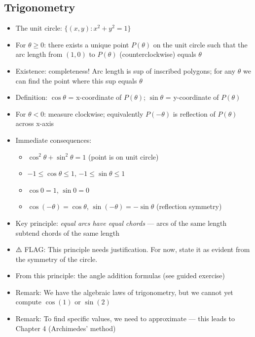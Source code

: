 \documentclass[
  10pt,
  letterpaper,
]{scrbook}
\providecommand{\tightlist}{%
  \setlength{\itemsep}{0pt}\setlength{\parskip}{0pt}}
\begin{document}
\subsection{Trigonometry}\label{trigonometry}

\begin{itemize}
\tightlist
\item
  The unit circle: \(\{(x, y) : x^2 + y^2 = 1\}\)
\item
  For \(\theta \geq 0\): there exists a unique point \(P(\theta)\) on
  the unit circle such that the arc length from \((1, 0)\) to
  \(P(\theta)\) (counterclockwise) equals \(\theta\)
\item
  Existence: completeness! Arc length is sup of inscribed polygons; for
  any \(\theta\) we can find the point where this sup equals \(\theta\)
\item
  Definition: \(\cos\theta\) = x-coordinate of \(P(\theta)\);
  \(\sin\theta\) = y-coordinate of \(P(\theta)\)
\item
  For \(\theta < 0\): measure clockwise; equivalently \(P(-\theta)\) is
  reflection of \(P(\theta)\) across x-axis
\item
  Immediate consequences:

  \begin{itemize}
  \tightlist
  \item
    \(\cos^2\theta + \sin^2\theta = 1\) (point is on unit circle)
  \item
    \(-1 \leq \cos\theta \leq 1\), \(-1 \leq \sin\theta \leq 1\)
  \item
    \(\cos 0 = 1\), \(\sin 0 = 0\)
  \item
    \(\cos(-\theta) = \cos\theta\), \(\sin(-\theta) = -\sin\theta\)
    (reflection symmetry)
  \end{itemize}
\item
  Key principle: \emph{equal arcs have equal chords} --- arcs of the
  same length subtend chords of the same length
\item
  ⚠️ FLAG: This principle needs justification. For now, state it as
  evident from the symmetry of the circle.
\item
  From this principle: the angle addition formulas (see guided exercise)
\item
  Remark: We have the algebraic laws of trigonometry, but we cannot yet
  compute \(\cos(1)\) or \(\sin(2)\)
\item
  Remark: To find specific values, we need to approximate --- this leads
  to Chapter 4 (Archimedes' method)
\end{itemize}
\end{document}
